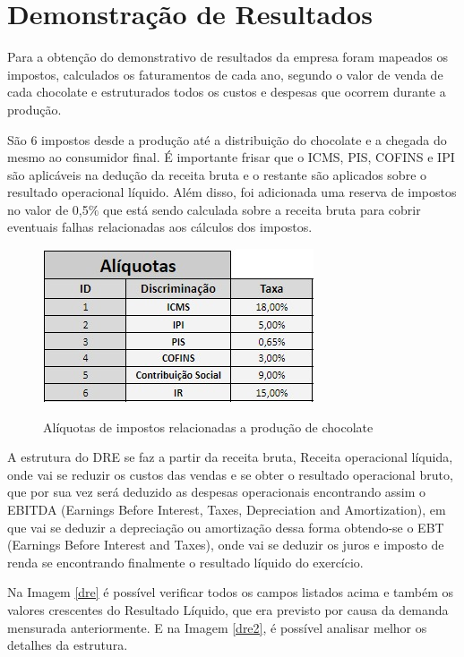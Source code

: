 \documentclass[
	12pt,				%
	openright,			%
	oneside,			%
	a4paper,			%
	english,			%
	french,				%
	spanish,			%
	brazil				%
	]{abntex2}
\begin{document}
\section{Demonstração de Resultados}

Para a obtenção do demonstrativo de resultados da empresa foram mapeados os impostos, calculados os faturamentos de cada ano, segundo o valor de venda de cada chocolate e estruturados todos os custos e despesas que ocorrem durante a produção.

São 6 impostos desde a produção até a distribuição do chocolate e a chegada do mesmo ao consumidor final. É importante frisar que o ICMS, PIS, COFINS e IPI são aplicáveis na dedução da receita bruta e o restante são aplicados sobre o resultado operacional líquido. Além disso, foi adicionada uma reserva de impostos no valor de 0,5$\%$ que está sendo calculada sobre a receita bruta para cobrir eventuais falhas relacionadas aos cálculos dos impostos.

\begin{figure}[H]
\begin{center}
\caption{Alíquotas de impostos relacionadas a produção de chocolate}
\includegraphics[scale=0.5]{a5.jpeg} 
\label{-}
\end{center}
\end{figure}

A estrutura do DRE  se faz a partir da receita bruta, Receita operacional líquida, onde vai se reduzir os custos das vendas e se obter o resultado operacional bruto, que por sua vez será deduzido as despesas operacionais encontrando assim o EBITDA (Earnings Before Interest, Taxes, Depreciation and Amortization), em que vai se deduzir a depreciação ou amortização dessa forma obtendo-se o EBT (Earnings Before Interest and Taxes), onde vai se deduzir os juros e imposto de renda se encontrando finalmente o resultado líquido do exercício.

Na Imagem \ref{dre} é possível verificar todos os campos listados acima e também os valores crescentes do Resultado Líquido, que era previsto por causa da demanda mensurada anteriormente. E na Imagem \ref{dre2}, é possível analisar melhor os detalhes da estrutura.
\end{document}
